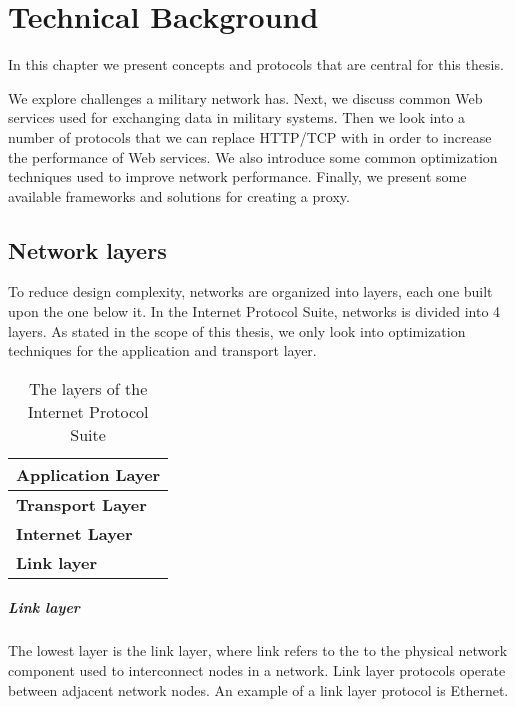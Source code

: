 \chapter{Technical Background}

In this chapter we present concepts and protocols that are central for this
thesis.

We explore challenges a military network has. Next, we discuss common Web
services used for exchanging data in military systems. Then we look into a
number of protocols that we can replace HTTP/TCP with in order to increase the
performance of Web services. We also introduce some common optimization
techniques used to improve network performance. Finally, we present some
available frameworks and solutions for creating a proxy.



\section{Network layers}

To reduce design complexity, networks are organized into layers, each one built
upon the one below it. In the Internet Protocol Suite\cite{rfc-1122}, networks
is divided into 4 layers. As stated in the scope of this thesis, we only look
into optimization techniques for the application and transport layer.

\begin{table}[h]
\begin{tabularx}{\textwidth}{| X |}
\hline
  \textbf{Application Layer} \\ \hline
  \textbf{Transport Layer} \\ \hline
  \textbf{Internet Layer} \\ \hline
  \textbf{Link layer} \\ \hline
\end{tabularx}
\caption{The layers of the Internet Protocol Suite}
\end{table}

\paragraph{Link layer}

The lowest layer is the link layer, where link refers to the to the physical
network component used to interconnect nodes in a network. Link layer protocols
operate between adjacent network nodes. An example of a link layer protocol is
Ethernet.


